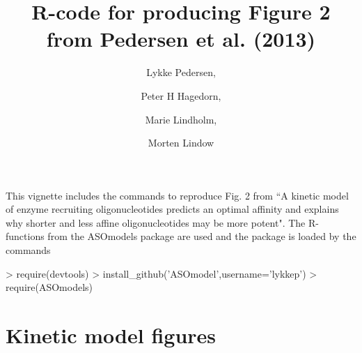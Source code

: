 \documentclass{article}
\title{R-code for producing Figure 2 from Pedersen et al. (2013)}
\author{Lykke Pedersen, \and Peter H Hagedorn, \and Marie Lindholm, \and Morten Lindow}
\date{}
\begin{document}



\maketitle
This vignette includes the commands to reproduce Fig. 2 from ``A kinetic model of enzyme recruiting oligonucleotides predicts an optimal affinity and explains why shorter and less affine oligonucleotides may be more potent". The R-functions from the ASOmodels package are used and the package is loaded by the commands

\begin{Schunk}
\begin{Sinput}
> require(devtools)
> install_github('ASOmodel',username='lykkep')
> require(ASOmodels)
\end{Sinput}
\end{Schunk}

\section*{Kinetic model figures}
\end{document}
